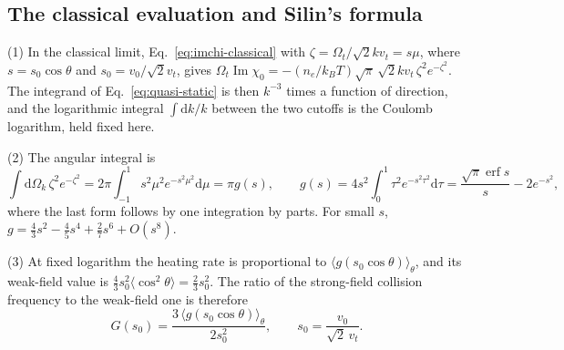 \documentclass[11pt]{article}
\numberwithin{equation}{section}
\newcommand{\dd}{\mathrm d}
\newcommand{\kB}{k_B}
\DeclareMathOperator{\Imag}{Im}
\DeclareMathOperator{\erf}{erf}
\begin{document}
\subsection{The classical evaluation and Silin's formula}
{\noindent}(1) In the classical limit, Eq.~\eqref{eq:imchi-classical} with
$\zeta=\Omega_t/\sqrt2kv_t=s\mu$, where $s=s_0\cos\theta$ and
$s_0=v_0/\sqrt2v_t$, gives
$\Omega_t\Imag\chi_0=-(n_e/\kB T)\sqrt\pi\,\sqrt2kv_t\,\zeta^2e^{-\zeta^2}$. The
integrand of Eq.~\eqref{eq:quasi-static} is then $k^{-3}$ times a function of
direction, and the logarithmic integral $\int\dd k/k$ between the two cutoffs
is the Coulomb logarithm, held fixed here.

{\noindent}(2) The angular integral is
\begin{equation}
\int\dd\Omega_k\,\zeta^2e^{-\zeta^2}=2\pi\int_{-1}^1s^2\mu^2e^{-s^2\mu^2}\dd\mu=\pi g(s),\qquad
g(s)=4s^2\int_0^1\tau^2e^{-s^2\tau^2}\dd\tau=\frac{\sqrt\pi\erf s}{s}-2e^{-s^2},
\label{eq:g-function}
\end{equation}
where the last form follows by one integration by parts. For small $s$,
$g=\tfrac43s^2-\tfrac45s^4+\tfrac27s^6+O(s^8)$.

{\noindent}(3) At fixed logarithm the heating rate is proportional to
$\langle g(s_0\cos\theta)\rangle_\theta$, and its weak-field value is
$\tfrac43s_0^2\langle\cos^2\theta\rangle=\tfrac23s_0^2$. The ratio of the strong-field
collision frequency to the weak-field one is therefore
\begin{equation}
\boxed{\;G(s_0)=\frac{3\,\langle g(s_0\cos\theta)\rangle_\theta}{2s_0^2},\qquad s_0=\frac{v_0}{\sqrt2\,v_t}.\;}
\label{eq:G}
\end{equation}
\end{document}
